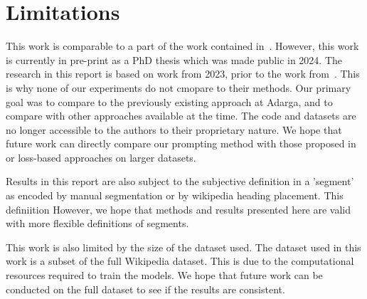 \section*{Limitations}

This work is comparable to a part of the work contained in~\cite{XingThesis}. However, this work is currently in pre-print as a PhD thesis which was made public in 2024. The research in this report is based on work from 2023, prior to the work from~\cite{XingThesis}. This is why none of our experiments do not cmopare to their methods. Our primary goal was to compare to the previously existing approach at Adarga, and to compare with other approaches available at the time. The code and datasets are no longer accessible to the authors to their proprietary nature. We hope that future work can directly compare our prompting method with those proposed in~\cite{XingThesis} or loss-based approaches on larger datasets.

Results in this report are also subject to the subjective definition in a 'segment' as encoded by manual segmentation or by wikipedia heading placement. This definiition However, we hope that methods and results presented here are valid with more flexible definitions of segments.

This work is also limited by the size of the dataset used. The dataset used in this work is a subset of the full Wikipedia dataset. This is due to the computational resources required to train the models. We hope that future work can be conducted on the full dataset to see if the results are consistent.